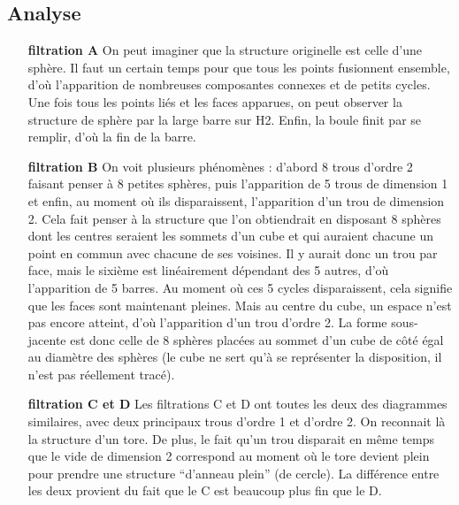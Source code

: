 \documentclass[french, a4paper, 12pt]{article}
\begin{document}
\subsection{Analyse}

\begin{itemize}
    \item[\textbf{filtration A}]
        On peut imaginer que la structure originelle est celle 
        d’une sphère. Il faut un certain temps pour que tous les 
        points fusionnent ensemble, d’où l’apparition de nombreuses 
        composantes connexes et de petits cycles. Une fois tous les 
        points liés et les faces apparues, on peut observer la 
        structure de sphère par la large barre sur H2. Enfin, la 
        boule finit par se remplir, d’où la fin de la barre.
    \item[\textbf{filtration B}]
        On voit plusieurs phénomènes : d’abord 8 trous d’ordre 2 
        faisant penser à 8 petites sphères, puis l’apparition de 5 
        trous de dimension 1 et enfin, au moment où ils disparaissent, 
        l’apparition d’un trou de dimension 2. Cela fait penser à la 
        structure que l’on obtiendrait en disposant 8 sphères dont les 
        centres seraient les sommets d’un cube et qui auraient chacune 
        un point en commun avec chacune de ses voisines. Il y aurait 
        donc un trou par face, mais le sixième est linéairement 
        dépendant des 5 autres, d’où l’apparition de 5 barres. Au 
        moment où ces 5 cycles disparaissent, cela signifie que les 
        faces sont maintenant pleines. Mais au centre du cube, un 
        espace n’est pas encore atteint, d’où l’apparition d’un trou 
        d’ordre 2. La forme sous-jacente est donc celle de 8 sphères 
        placées au sommet d’un cube  de côté égal au diamètre des 
        sphères (le cube ne sert qu’à se représenter la disposition, 
        il n’est pas réellement tracé).
    \item[\textbf{filtration C et D}]
        Les filtrations C et D ont toutes les deux des diagrammes 
        similaires, avec deux principaux trous d’ordre 1 et d’ordre 2. 
        On reconnait là la structure d’un tore. De plus, le fait qu’un 
        trou disparait en même temps que le vide de dimension 2 
        correspond au moment où le tore devient plein pour prendre une 
        structure “d’anneau plein” (de cercle). La différence entre 
        les deux provient du fait que le C est beaucoup plus fin que le D.
\end{itemize}
\end{document}

